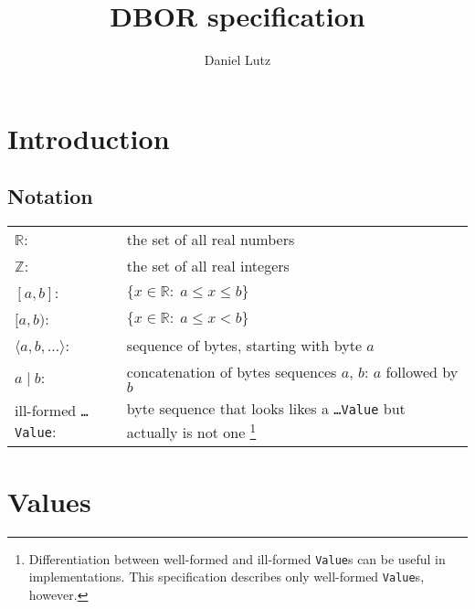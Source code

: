 \documentclass[headings=normal, headsepline, numbers=noenddot, fleqn, a4paper]{scrartcl}
\title{DBOR specification \DborVersion}
\author{Daniel Lutz}
\let\mathbbm\mathds
\newcommand{\SetOfReals}{\mathbbm{R}}
\newcommand{\SetOfIntegers}{\mathbbm{Z}}
\newcommand{\DborSyntaxIdent}[1]{\texttt{#1}}
\begin{document}
    \maketitle
    \tableofcontents

    \section{Introduction}

    \subsection{Notation}

    \noindent
    {%
        \setlength\extrarowheight{0.8ex}%
        \begin{tabular}{@{} p{} p{}}
            $\SetOfReals$: &
                the set of all real numbers \\
            $\SetOfIntegers$: &
                the set of all real integers \\
            $[a, b]$: & 
                $\{x \in \SetOfReals{:}\; a \le x \le b\}$ \\
            $[a, b)$: &
                $\{x \in \SetOfReals{:}\; a \le x < b\}$ \\
            $\langle a, b, \ldots\rangle$: & 
                sequence of bytes, starting with byte $a$ \\
            $a \mid b$: & 
                concatenation of bytes sequences $a$, $b$: $a$ followed by $b$ \\
            ill-formed \DborSyntaxIdent{\dots Value}: & 
                byte sequence that looks likes a \DborSyntaxIdent{\dots Value} but actually
                is not one%
                \footnote{
                    Differentiation between well-formed and ill-formed \DborSyntaxIdent{Value}s 
                    can be useful in implementations.
                    This specification describes only well-formed \DborSyntaxIdent{Value}s, however.
                } \\             
        \end{tabular}%
    }


    \section{Values}
    \label{sec:values}
\end{document}
